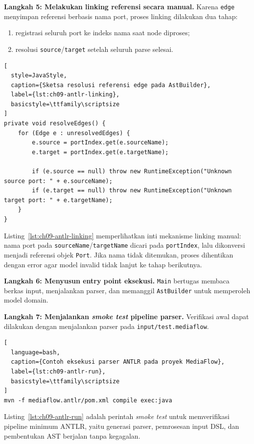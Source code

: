 \textbf{Langkah 5: Melakukan linking referensi secara manual.} Karena \texttt{edge} menyimpan referensi berbasis nama port, proses linking dilakukan dua tahap:
\begin{enumerate}
  \item registrasi seluruh port ke indeks nama saat node diproses;
  \item resolusi \texttt{source}/\texttt{target} setelah seluruh parse selesai.
\end{enumerate}

\begin{lstlisting}[
  style=JavaStyle,
  caption={Sketsa resolusi referensi edge pada AstBuilder},
  label={lst:ch09-antlr-linking},
  basicstyle=\ttfamily\scriptsize
]
private void resolveEdges() {
    for (Edge e : unresolvedEdges) {
        e.source = portIndex.get(e.sourceName);
        e.target = portIndex.get(e.targetName);

        if (e.source == null) throw new RuntimeException("Unknown source port: " + e.sourceName);
        if (e.target == null) throw new RuntimeException("Unknown target port: " + e.targetName);
    }
}
\end{lstlisting}

\noindent Listing~\ref{lst:ch09-antlr-linking} memperlihatkan inti mekanisme linking manual: nama port pada \texttt{sourceName}/\texttt{targetName} dicari pada \texttt{portIndex}, lalu dikonversi menjadi referensi objek \texttt{Port}. Jika nama tidak ditemukan, proses dihentikan dengan error agar model invalid tidak lanjut ke tahap berikutnya.

\textbf{Langkah 6: Menyusun entry point eksekusi.} \texttt{Main} bertugas membaca berkas input, menjalankan parser, dan memanggil \texttt{AstBuilder} untuk memperoleh model domain.

\textbf{Langkah 7: Menjalankan \textit{smoke test} pipeline parser.} Verifikasi awal dapat dilakukan dengan menjalankan parser pada \texttt{input/test.mediaflow}.

\begin{lstlisting}[
  language=bash,
  caption={Contoh eksekusi parser ANTLR pada proyek MediaFlow},
  label={lst:ch09-antlr-run},
  basicstyle=\ttfamily\scriptsize
]
mvn -f mediaflow.antlr/pom.xml compile exec:java
\end{lstlisting}

\noindent Listing~\ref{lst:ch09-antlr-run} adalah perintah \textit{smoke test} untuk memverifikasi pipeline minimum ANTLR, yaitu generasi parser, pemrosesan input DSL, dan pembentukan AST berjalan tanpa kegagalan.

